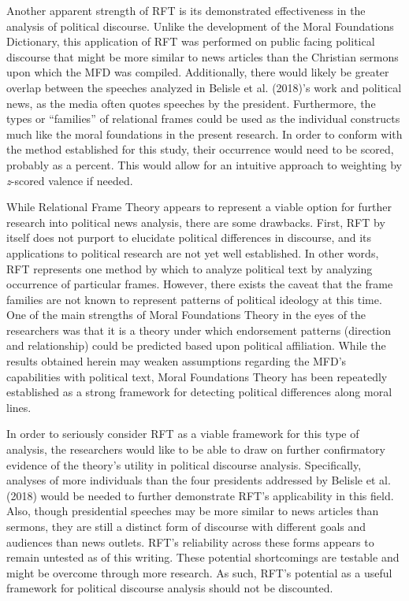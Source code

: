 \documentclass[english,,man]{apa6}
\begin{document}
Another apparent strength of RFT is its demonstrated effectiveness in
the analysis of political discourse. Unlike the development of the Moral
Foundations Dictionary, this application of RFT was performed on public
facing political discourse that might be more similar to news articles
than the Christian sermons upon which the MFD was compiled.
Additionally, there would likely be greater overlap between the speeches
analyzed in Belisle et al. (2018)'s work and political news, as the
media often quotes speeches by the president. Furthermore, the types or
\enquote{families} of relational frames could be used as the individual
constructs much like the moral foundations in the present research. In
order to conform with the method established for this study, their
occurrence would need to be scored, probably as a percent. This would
allow for an intuitive approach to weighting by \emph{z}-scored valence
if needed.

While Relational Frame Theory appears to represent a viable option for
further research into political news analysis, there are some drawbacks.
First, RFT by itself does not purport to elucidate political differences
in discourse, and its applications to political research are not yet
well established. In other words, RFT represents one method by which to
analyze political text by analyzing occurrence of particular frames.
However, there exists the caveat that the frame families are not known
to represent patterns of political ideology at this time. One of the
main strengths of Moral Foundations Theory in the eyes of the
researchers was that it is a theory under which endorsement patterns
(direction and relationship) could be predicted based upon political
affiliation. While the results obtained herein may weaken assumptions
regarding the MFD's capabilities with political text, Moral Foundations
Theory has been repeatedly established as a strong framework for
detecting political differences along moral lines.

In order to seriously consider RFT as a viable framework for this type
of analysis, the researchers would like to be able to draw on further
confirmatory evidence of the theory's utility in political discourse
analysis. Specifically, analyses of more individuals than the four
presidents addressed by Belisle et al. (2018) would be needed to further
demonstrate RFT's applicability in this field. Also, though presidential
speeches may be more similar to news articles than sermons, they are
still a distinct form of discourse with different goals and audiences
than news outlets. RFT's reliability across these forms appears to
remain untested as of this writing. These potential shortcomings are
testable and might be overcome through more research. As such, RFT's
potential as a useful framework for political discourse analysis should
not be discounted.
\end{document}
